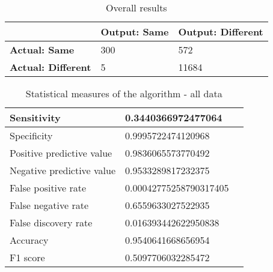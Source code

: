 \begin{table}[H]
    \centering
    \begin{spacing}{1.5}
    \begin{tabular}{|l|l|l|}
        \hline
        \cellcolor{gray} & \textbf{Output: Same} & \textbf{Output: Different} \\ [0.5ex]
        \hline\hline
        \textbf{Actual: Same} & 300 & 572 \\ [0.5ex]
        \hline
        \textbf{Actual: Different} & 5 & 11684 \\ [0.5ex]
        \hline
    \end{tabular}
    \end{spacing}
    \caption{Overall results}
    \label{tab:overall_results}
\end{table}
        
\begin{table}[H]
    \centering
    \begin{spacing}{1.5}
    \begin{tabular}{|l|l|l|}
        \hline
        Sensitivity                 & 0.3440366972477064 \\
        \hline
        Specificity                 & 0.9995722474120968 \\
        \hline
        Positive predictive value   & 0.9836065573770492 \\
        \hline
        Negative predictive value   & 0.9533289817232375 \\
        \hline
        False positive rate         & 0.00042775258790317405 \\
        \hline
        False negative rate         & 0.6559633027522935 \\
        \hline
        False discovery rate        & 0.016393442622950838 \\
        \hline
        Accuracy                    & 0.9540641668656954 \\
        \hline
        F1 score                    & 0.5097706032285472 \\
        \hline
    \end{tabular}
    \end{spacing}
    \caption{Statistical measures of the algorithm - all data}
\end{table}


